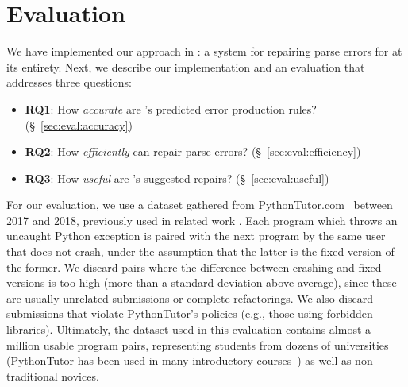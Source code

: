 \section{Evaluation}
\label{sec:eval}

We have implemented our approach in \toolname: a system for
repairing parse errors for \python at its entirety. Next,
we describe our implementation and an evaluation that addresses three
questions:

\begin{itemize}
    \item \textbf{RQ1}: How \emph{accurate} are \toolname's predicted error production rules?
                        (\S~\ref{sec:eval:accuracy})
    \item \textbf{RQ2}: How \emph{efficiently} can \toolname repair parse errors?
                        (\S~\ref{sec:eval:efficiency})
    \item \textbf{RQ3}: How \emph{useful} are \toolname's suggested repairs?
                        (\S~\ref{sec:eval:useful})

\end{itemize}


%
For our evaluation, we use a \python dataset gathered from
PythonTutor.com~\citep{Guo2013} between 2017 and 2018, previously used in
related work \citep{Endres2019,Cosman2020}. Each program which throws an
uncaught Python exception is paired with the next program by the same user that
does not crash, under the assumption that the latter is the fixed version of the
former. We discard pairs where the difference between crashing and fixed
versions is too high (more than a standard deviation above average), since these
are usually unrelated submissions or complete refactorings. We also discard
submissions that violate PythonTutor's policies (e.g., those using forbidden
libraries). Ultimately, the dataset used in this evaluation contains almost a
million usable program pairs, representing students from dozens of universities
(PythonTutor has been used in many introductory courses~\citep{Guo2013}) as well
as non-traditional novices.

